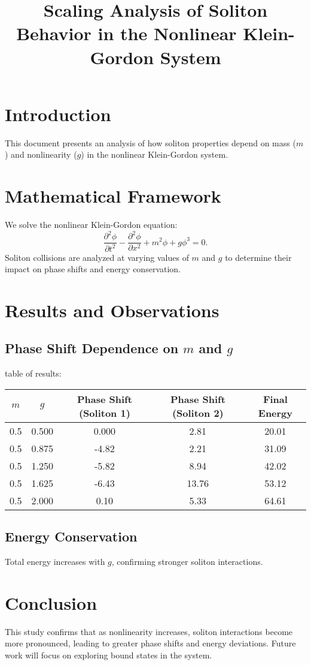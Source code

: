 \documentclass{article}
\title{Scaling Analysis of Soliton Behavior in the Nonlinear Klein-Gordon System}
\author{}
\date{}
\begin{document}
\maketitle

\section{Introduction}
This document presents an analysis of how soliton properties depend on mass ($m$) and nonlinearity ($g$) in the nonlinear Klein-Gordon system.

\section{Mathematical Framework}
We solve the nonlinear Klein-Gordon equation:
\begin{equation}
\frac{\partial^2 \phi}{\partial t^2} - \frac{\partial^2 \phi}{\partial x^2} + m^2 \phi + g \phi^3 = 0.
\end{equation}
Soliton collisions are analyzed at varying values of $m$ and $g$ to determine their impact on phase shifts and energy conservation.

\section{Results and Observations}
\subsection{Phase Shift Dependence on $m$ and $g$}

table of results:
\begin{center}
\begin{tabular}{|c|c|c|c|c|}
\hline
$m$ & $g$ & Phase Shift (Soliton 1) & Phase Shift (Soliton 2) & Final Energy \\
\hline
0.5 & 0.500 & 0.000 & 2.81 & 20.01 \\
0.5 & 0.875 & -4.82 & 2.21 & 31.09 \\
0.5 & 1.250 & -5.82 & 8.94 & 42.02 \\
0.5 & 1.625 & -6.43 & 13.76 & 53.12 \\
0.5 & 2.000 & 0.10 & 5.33 & 64.61 \\
\hline
\end{tabular}
\end{center}

\subsection{Energy Conservation}
Total energy increases with $g$, confirming stronger soliton interactions.

\section{Conclusion}
This study confirms that as nonlinearity increases, soliton interactions become more pronounced, leading to greater phase shifts and energy deviations. Future work will focus on exploring bound states in the system.
\end{document}
